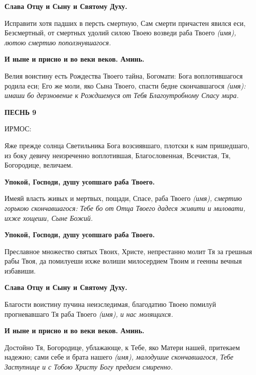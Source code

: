\bfseries Слава Отцу и Сыну и Святому Духу.\normalfont{}\normalfont{}


Исправити хотя падших в персть смертную, Сам смерти причастен явился еси, Безсмертный, от смертных удолий силою Твоею возведи раба Твоего \itshape (имя)\normalfont{}, лютою смертию поползнувшагося.


\bfseries И ныне и присно и во веки веков. Аминь.\normalfont{}\normalfont{}


Велия воистину есть Рождества Твоего тайна, Богомати: Бога воплотившагося родила еси; Его же моли, яко Сына Твоего, спасти бедне скончавшагося \itshape (имя)\normalfont{}: имаши бо дерзновение к Рождшемуся от Тебя Благоутробному Спасу мира. 


\bfseries ПЕСНЬ 9


ИРМОС:\normalfont{}


Яже прежде солнца Светильника Бога возсиявшаго, плотски к нам пришедшаго, из боку девичу неизреченно воплотившая, Благословенная, Всечистая, Тя, Богородице, величаем.


\bfseries Упокой, Господи, душу усопшаго раба Твоего.\normalfont{}\normalfont{}


Имеяй власть живых и мертвых, пощади, Спасе, раба Твоего \itshape (имя)\normalfont{}, смертию горькою скончавшагося: Тебе бо от Отца Твоего дадеся живити и миловати, ихже хощеши, Сыне Божий.


\bfseries Упокой, Господи, душу усопшаго раба Твоего.\normalfont{}\normalfont{}


Преславное множество святых Твоих, Христе, непрестанно молит Тя за грешныя рабы Твоя, да помилуеши ихже волиши милосердием Твоим и геенны вечныя избавиши.


\bfseries Слава Отцу и Сыну и Святому Духу.\normalfont{}\normalfont{}


Благости воистину пучина неизследимая, благодатию Твоею помилуй прогневавшаго Тя раба Твоего \itshape (имя)\normalfont{}, и нас молящихся.


\bfseries И ныне и присно и во веки веков. Аминь.\normalfont{}\normalfont{}


Достойно Тя, Богородице, ублажающе, к Тебе, яко Матери нашей, притекаем надежно; сами себе и брата нашего \itshape (имя)\normalfont{}, малодушие скончавшагося, Тебе Заступнице и с Тобою Христу Богу предаем смиренно. 
\mychapterending

 


